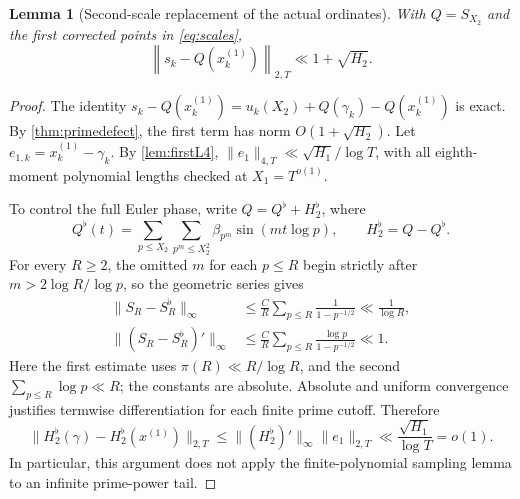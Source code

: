 \documentclass[11pt,reqno]{amsart}
\numberwithin{equation}{section}
\newtheorem{lemma}[theorem]{Lemma}
\begin{document}
\begin{lemma}[Second-scale replacement of the actual ordinates]
\label{lem:secondreplacement}
With $Q=S_{X_2}$ and the first corrected points in
\eqref{eq:scales},
\begin{equation}\label{eq:secondreplacement}
\left\|s_k-Q(x_k^{(1)})\right\|_{2,T}
\ll1+\sqrt{H_2}.
\end{equation}
\end{lemma}
\begin{proof}
The identity
$s_k-Q(x_k^{(1)})=u_k(X_2)+Q(\gamma_k)-Q(x_k^{(1)})$
is exact.  By \cref{thm:primedefect}, the first term has norm
$O(1+\sqrt{H_2})$.
Let $e_{1,k}=x_k^{(1)}-\gamma_k$.
By \cref{lem:firstL4},
$\|e_1\|_{4,T}\ll\sqrt{H_1}/\log T$,
with all eighth-moment polynomial lengths checked at $X_1=T^{o(1)}$.

To control the full Euler phase, write $Q=Q^\flat+H_2^\flat$, where
\begin{equation}\label{eq:Qflatlocal}
Q^\flat(t)=\sum_{p\le X_2}\sum_{p^m\le X_2^2}
\beta_{p^m}\sin(mt\log p),\qquad
H_2^\flat=Q-Q^\flat.
\end{equation}
For every $R\ge2$, the omitted $m$ for each $p\le R$ begin
strictly after $m>2\log R/\log p$, so the geometric series gives
\begin{equation}\label{eq:derivativetail}
\begin{split}
\|S_R-S_R^\flat\|_\infty
&\le \frac{C}{R}\sum_{p\le R}\frac1{1-p^{-1/2}}
 \ll \frac1{\log R},\\
\|(S_R-S_R^\flat)'\|_\infty
&\le\frac{C}{R}\sum_{p\le R}
 \frac{\log p}{1-p^{-1/2}}\ll1.
\end{split}
\end{equation}
Here the first estimate uses $\pi(R)\ll R/\log R$,
and the second $\sum_{p\le R}\log p\ll R$;
the constants are absolute. Absolute and uniform convergence
justifies termwise differentiation for each finite prime cutoff.
Therefore
\begin{equation}\label{eq:tailtransport}
\|H_2^\flat(\gamma)-H_2^\flat(x^{(1)})\|_{2,T}
\le \|(H_2^\flat)'\|_\infty\|e_1\|_{2,T}
\ll\frac{\sqrt{H_1}}{\log T}=o(1).
\end{equation}
In particular, this argument does not apply the finite-polynomial
sampling lemma to an infinite prime-power tail.


\end{proof}
\end{document}
